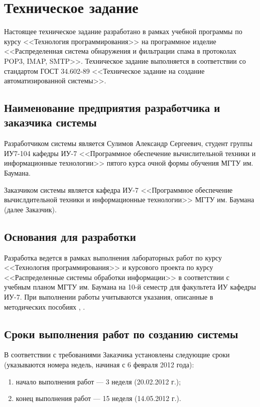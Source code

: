 \chapter{Техническое задание}
\label{cha:analysis}
%
%
Настоящее техническое задание разработано в рамках учебной программы по курсу <<Технология программирования>> на программное изделие <<Распределенная система обнаружения и фильтрации спама в протоколах POP3, IMAP, SMTP>>. Техническое задание выполняется в соответствии со стандартом ГОСТ 34.602-89 <<Техническое задание на создание автоматизированной системы>>.

\section{Наименование предприятия разработчика и заказчика системы}
Разработчиком системы является Сулимов Александр Сергеевич, студент группы ИУ7-104 кафедры ИУ-7 <<Программное обеспечение вычислительной техники и информационные технологии>> пятого курса очной формы обучения МГТУ им. Баумана.

Заказчиком системы является кафедра ИУ-7 <<Программное обеспечение вычислдительной техники и информационные технологии>> МГТУ им. Баумана (далее Заказчик).

\section{Основания для разработки}
Разработка ведется в рамках выполнения лабораторных работ по курсу <<Технология программирования>> и курсового проекта по курсу <<Распределенные системы обработки информации>> в соответствии с учебным планом МГТУ им. Баумана на 10-й семестр для факультета ИУ кафедры ИУ-7. При выполнении работы учитываются указания, описанные в методических пособиях \cite{metodRomanova}, \cite{metodKKrishenko}.

\section{Сроки выполнения работ по созданию системы}
В соответствии с требованиями Заказчика установлены следующие сроки (указываются номера недель, начиная с 6 февраля 2012 года):

\begin{enumerate}
	\item начало выполнения работ --- 3 неделя (20.02.2012 г.);
	\item конец выполнения работ --- 15 неделя (14.05.2012 г.).
\end{enumerate}

